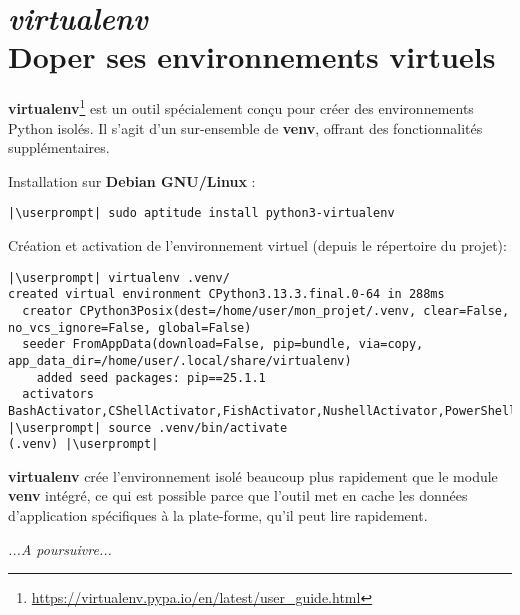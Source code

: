 \chapter[\textit{virtualenv}]{\textit{virtualenv} \\ Doper ses environnements virtuels}

\bigskip

\textbf{virtualenv}\footnote{\url{https://virtualenv.pypa.io/en/latest/user_guide.html}} est un outil spécialement conçu pour créer des environnements Python isolés. Il s'agit d'un sur-ensemble de \textbf{venv}, offrant des fonctionnalités supplémentaires.

Installation sur \textbf{Debian GNU/Linux} :
\begin{lstlisting}[style=bash]
|\userprompt| sudo aptitude install python3-virtualenv
\end{lstlisting}

Création et activation de l'environnement virtuel (depuis le répertoire du projet):
\begin{lstlisting}[style=bash]
|\userprompt| virtualenv .venv/
created virtual environment CPython3.13.3.final.0-64 in 288ms
  creator CPython3Posix(dest=/home/user/mon_projet/.venv, clear=False, no_vcs_ignore=False, global=False)
  seeder FromAppData(download=False, pip=bundle, via=copy, app_data_dir=/home/user/.local/share/virtualenv)
    added seed packages: pip==25.1.1
  activators BashActivator,CShellActivator,FishActivator,NushellActivator,PowerShellActivator,PythonActivator
|\userprompt| source .venv/bin/activate
(.venv) |\userprompt|
\end{lstlisting}

\textbf{virtualenv} crée l'environnement isolé beaucoup plus rapidement que le module \textbf{venv} intégré, ce qui est possible parce que l'outil met en cache les données d'application spécifiques à la plate-forme, qu'il peut lire rapidement.

\textit{...A poursuivre...}

\begin{center}
\end{center}


